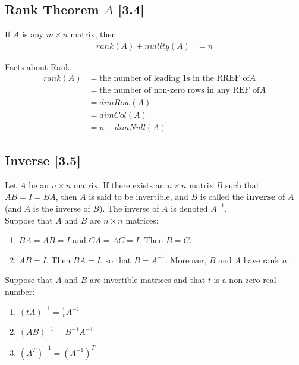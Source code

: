 \documentclass[a4paper,9pt]{extarticle}
\begin{document}
\begin{multicols*}{2}

\subsection{Rank Theorem $A$ [3.4]}
If $A$ is any $m \times n$ matrix, then
\begin{equation} \label{3.4-5}
    \begin{split}
        rank(A) + nullity(A) & = n
    \end{split}
\end{equation}

Facts about Rank:
\begin{equation} \label{3.4-6}
    \begin{split}
        rank(A) & = \textrm{the number of leading 1s in the RREF of} A \\
        & = \textrm{the number of non-zero rows in any REF of} A \\
        & = dim Row(A) \\
        & = dim Col(A) \\
        & = n - dim Null(A)
    \end{split}
\end{equation}


\subsection{Inverse [3.5]}
Let $A$ be an $n \times n$ matrix. If there exists an $n \times n$ matrix $B$ such that $AB = I = BA$, then $A$ is said to be invertible, and $B$ is called the \textbf{inverse} of $A$ (and $A$ is the inverse of $B$). The inverse of $A$ is denoted $A^{-1}$. \\

\noindent Suppose that $A$ and $B$ are $n \times n$ matrices:
\begin{enumerate}[label=\bfseries (\arabic*)] \itemsep0pt \parskip0pt 
    \item $BA = AB = I$ and $CA = AC = I$. Then $B = C$.
    \item $AB = I$. Then $BA = I$, so that $B = A^{-1}$. Moreover, $B$ and $A$ have rank $n$.
\end{enumerate}

\noindent Suppose that $A$ and $B$ are invertible matrices and that $t$ is a non-zero real number:
\begin{enumerate}[label=\bfseries (\arabic*)] \itemsep0pt \parskip0pt 
    \item $(tA)^{-1} = \frac{1}{t} A^{-1}$
    \item $(AB)^{-1} = B^{-1} A^{-1}$
    \item $(A^T)^{-1} = (A^{-1})^T$
\end{enumerate}


\end{multicols*}
\end{document}
